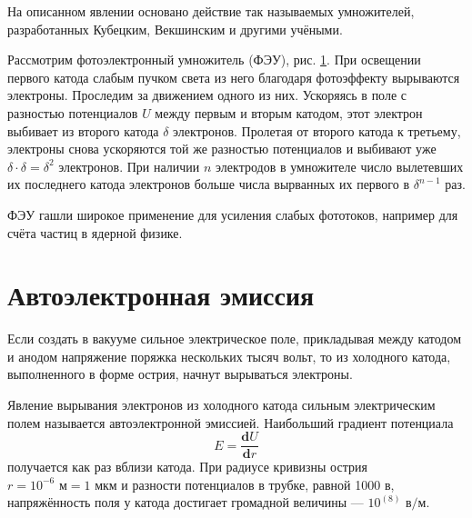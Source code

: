 \documentclass[a4paper,10pt]{book}
\begin{document}
\begin{figure}[h]
	\caption{}
	\label{pic49}
\end{figure}

На описанном явлении основано действие так называемых умножителей, разработанных Кубецким, Векшинским и другими учёными.

Рассмотрим фотоэлектронный умножитель (ФЭУ), рис. \ref{pic49}. При освещении первого катода слабым пучком света из него благодаря фотоэффекту вырываются электроны. Проследим за движением одного из них. Ускоряясь в поле с разностью потенциалов $U$ между первым и вторым катодом, этот электрон выбивает из второго катода $\delta$ электронов. Пролетая от второго катода к третьему, электроны снова ускоряются той же разностью потенциалов и выбивают уже $\delta\cdot\delta=\delta^{2}$ электронов. При наличии $n$ электродов в умножителе число вылетевших их последнего катода электронов больше числа вырванных их первого в $\delta^{n-1}$ раз.

ФЭУ гашли широкое применение для усиления слабых фототоков, например для счёта частиц в ядерной физике.

\section{Автоэлектронная эмиссия}

Если создать в вакууме сильное электрическое поле, прикладывая между катодом и анодом напряжение поряжка нескольких тысяч вольт, то из холодного катода, выполненного в форме острия, начнут вырываться электроны.

Явление вырывания электронов из холодного катода сильным электрическим полем называется автоэлектронной эмиссией. Наибольший градиент потенциала\begin{equation}
E = \frac{\mathbf{d}U}{\mathbf{d}r}
\end{equation} получается как раз вблизи катода. При радиусе кривизны острия $r=10^{-6} \textit{ м} = 1 \textit{ мкм} $ и разности потенциалов в трубке, равной 1000 $\textit{в}$, напряжённость поля у катода достигает громадной величины — $10^(8)\textit{ в/м} $.
\end{document}

